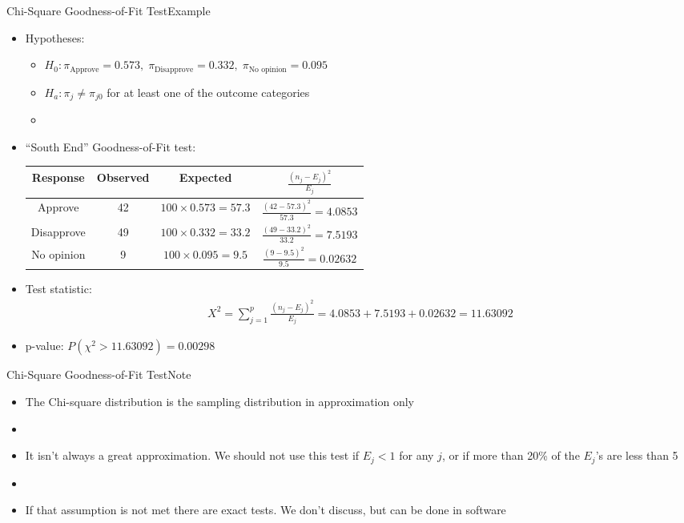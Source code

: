 \documentclass[xcolor=dvipsnames]{beamer}
\begin{document}
\begin{frame}{Chi-Square Goodness-of-Fit Test}{Example}
\begin{itemize}
	\item Hypotheses:
	\begin{itemize}
		\item $H_0: \pi_{\text{Approve}} = 0.573,\; \pi_{\text{Disapprove}} = 0.332,\; \pi_{\text{No opinion}}=0.095$
		\item $H_a: \pi_j \neq \pi_{j0}$ for at least one of the outcome categories
		\item[]
	\end{itemize}
	\item ``South End'' Goodness-of-Fit test:
	{\scriptsize
		\begin{center}
			\begin{tabular}{cccc}
				\hline
				Response & Observed & Expected & $\frac{(n_j-E_j)^2}{E_j}$ \\ \hline \hline
				Approve & 42 & $100 \times 0.573 = 57.3$ & $\frac{(42-57.3)^2}{57.3} = 4.0853$\\
				Disapprove & 49 & $100 \times 0.332 = 33.2$ & $\frac{(49-33.2)^2}{33.2} = 7.5193$\\
				No opinion & 9 & $100 \times 0.095 = 9.5$ & $\frac{(9-9.5)^2}{9.5}=0.02632$\\ \hline
			\end{tabular}
	\end{center}}
	\vspace{1mm}
	\item Test statistic: 
	\begin{gather*}
	X^2 = \sum_{j=1}^p \frac{(n_j-E_j)^2}{E_j} = 4.0853 + 7.5193 + 0.02632 = 11.63092
	\end{gather*}
	\item p-value: $P(\chi^2 > 11.63092) = 0.00298$
\end{itemize}
\end{frame}

\begin{frame}{Chi-Square Goodness-of-Fit Test}{Note}
	\begin{itemize}
		\item The Chi-square distribution is the sampling distribution in approximation only
		\item[]
		\item It isn't always a great approximation. We should not use this test if $E_j <1$ for any $j$, or if more than 20\% of the $E_j$'s are less than 5
		\item[]
		\item If that assumption is not met there are exact tests. We don't discuss, but can be done in software
	\end{itemize}
\end{frame}
\end{document}
